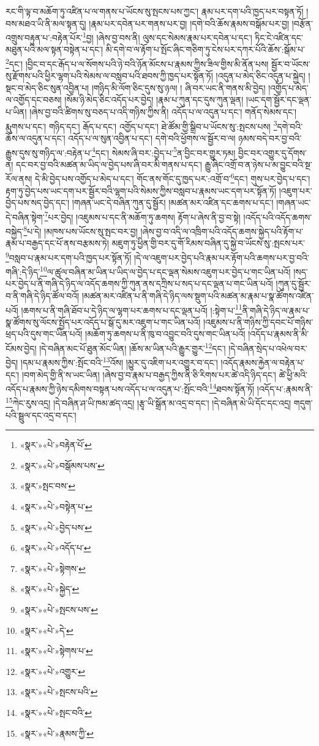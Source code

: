 རང་གི་ལྟ་བ་མཆོག་ཏུ་འཛིན་པ་ལ་གནས་པ་ཡོངས་སུ་སྤངས་པས་ཀྱང་། རྣམ་པར་དག་པའི་ཁྱད་པར་བསྟན་ཏོ། །བས་མཐའ་ཡི་ནི་མལ་སྟན་དུ། །རྣམ་པར་དབེན་པར་གནས་པར་བྱ། །དགེ་བའི་ཆོས་རྣམས་བསྒོམ་པར་བྱ། །བརྩོན་འགྲུས་བརྟུན་པ་:བརྟེན་པོར་\footnote{«སྣར་»«པེ་»བརྟེན་པོ་}བྱ། །ཞེས་བྱ་བས་ནི། ལུས་དང་སེམས་རྣམ་པར་དབེན་པ་དང་། ཏིང་ངེ་འཛིན་དང་མཐུན་པའི་མལ་སྟན་བསྟེན་པ་དང་། མི་དགེ་བ་ལ་རྟོག་པ་སྤོང་ཞིང་གཅིག་ཏུ་ངེས་པར་དཀར་པོའི་ཆོས་:སྒོམ་པ་\footnote{«སྣར་»«པེ་»བསྒོམས་པས་}དང་། །བྱིང་བ་དང་རྒོད་པ་ལ་སོགས་པའི་ཉེ་བའི་ཉོན་མོངས་པ་རྣམས་ཀྱིས་ཟིལ་གྱིས་མི་ནོན་པས། སྦྱོར་བ་ཡོངས་སུ་རྫོགས་པའི་ཕྱིར་ལྷག་པའི་སེམས་ལ་བསླབ་པའི་ཐབས་ཀྱི་ཁྱད་པར་སྟོན་ཏོ། །འདུན་པ་མེད་ཅིང་འདུན་པ་སྐྱེད། །སྡང་བ་མེད་ཅིང་སུན་འབྱིན་པ། །གཉིད་མི་ལོག་ཅིང་དུས་སུ་ཉལ། །
ཞི་བར་ཡང་ནི་གནས་མི་བྱེད། །འགྱོད་པ་མེད་ལ་འགྱོད་དང་བཅས། །སོམ་ཉི་མེད་ཅིང་འདོད་པར་བྱེད། །རྣམ་པ་ཀུན་དང་དུས་ཀུན་ལྡན། །ཡང་དག་སྦྱོར་དང་ལྡན་པ་ཡིན། །ཞེས་བྱ་བའི་ཚིགས་སུ་བཅད་པ་འདི་གཉིས་ཀྱིས་ནི། འདོད་པ་ལ་འདུན་པ་དང་། གནོད་སེམས་དང་། རྨུགས་པ་དང་། གཉིད་དང་། རྒོད་པ་དང་། འགྱོད་པ་དང་། ཐེ་ཚོམ་གྱི་སྒྲིབ་པ་ཡོངས་སུ་:སྤངས་པས། \footnote{«སྣར་»སྤང་བས་}དགེ་བའི་ཆོས་ལ་འདུན་པ་དང་། འདོད་པ་ལ་སུན་འབྱིན་པ་དང་། དགེ་བའི་ཕྱོགས་ལ་སྦྱོར་བ་ལ། ཉམས་བདེ་བར་བྱ་བའི་རྒྱུས་དུས་སུ་གཉིད་ལ་:བརྟེན་པ་\footnote{«སྣར་»«པེ་»བསྟེན་པ་}དང་། སེམས་ཞི་བར་:བྱེད་པ་\footnote{«སྣར་»«པེ་»བྱེད་པས་}ན་བྱིང་བར་གྱུར་ཏམ། བྱིང་བར་འགྱུར་དུ་དོགས་ན། དང་བར་བྱ་བའི་མཚན་མ་ཡིད་ལ་བྱེད་པས་ཞི་བར་མི་གནས་པ་དང་། རྒྱུ་ཞིང་འགྲོ་བ་ན་ཉེས་པ་མ་བྱུང་བའི་སྔ་རོལ་ནས། དེ་མི་བྱེད་པས་འགྱོད་པ་མེད་པ་དང་། གོང་ནས་གོང་དུ་ཁྱད་པར་:འགྲོ་བ་\footnote{«སྣར་»«པེ་»འདོད་པ་}དང་། གུས་པར་བྱེད་པ་དང་། རྟག་ཏུ་བྱེད་པས་ཡང་དག་པར་སྦྱོར་བའི་ལྷག་པའི་སེམས་ཀྱིས་བསླབ་པ་རྣམས་ཡང་དག་པར་སྟོན་ཏོ། །འཇུག་པར་བྱེད་པས་སད་བྱེད་དང་། །གཞན་ཡང་དེ་བཞིན་ཀུན་དུ་སྦྱོར། །མཚན་མར་འཛིན་དང་ཆགས་པ་དང་། །གཞན་ཡང་དེ་བཞིན་སྟེག་\footnote{«སྣར་»«པེ་»སྟེགས་}པར་བྱེད། །འཇུམས་པ་དང་ནི་མཆོག་ཏུ་ཆགས། རྟོག་པ་ཞེས་ནི་བྱ་བ་སྟེ། །འདོད་པའི་འདོད་ཆགས་བསྐྱེད་\footnote{«སྣར་»«པེ་»སྐྱེད་}པ་དེ། །མཁས་པས་ཡོངས་སུ་སྤང་བར་བྱ། །ཞེས་བྱ་བ་འདི་ལ་འཁྲིག་པའི་འདོད་ཆགས་སྐྱེད་པའི་རྟོག་པ་རྣམ་པ་བརྒྱད་དང་པོ་ནས་བརྩམས་ཏེ། མཇུག་ཏུ་ཕྱིན་གྱི་བར་དུ་གོ་རིམས་བཞིན་དུ་སྐྱེ་བ་ཡོངས་སུ་:སྤངས་པར་\footnote{«སྣར་»«པེ་»སྤངས་པས་}བསླབ་པ་རྣམ་པར་དག་པའི་ཁྱད་པར་སྟོན་ཏོ། །དེ་ལ་འཇུག་པར་བྱེད་པའི་རྣམ་པར་རྟོག་པའི་ཆགས་པར་བྱ་བའི་གཞི་:དེ་ཉིད་\footnote{«སྣར་»«པེ་»དེ་}ལ་ཚུལ་བཞིན་མ་ཡིན་པ་ཡིད་ལ་བྱེད་པ་དང་ལྡན་སེམས་འཇུག་པར་བྱེད་པ་གང་ཡིན་པའོ། །སད་པར་བྱེད་པ་ནི་གཞི་དེ་ཉིད་ལ་འདོད་ཆགས་ཀྱི་ཀུན་ནས་དཀྲིས་པ་སད་པ་དང་ལྡན་པ་གང་ཡིན་པའོ། །ཀུན་དུ་སྦྱོར་བ་ནི་གཞི་དེ་ཉིད་ཚོལ་བའོ། །མཚན་མར་འཛིན་པ་ནི་གཞི་དེ་ཉིད་ལས་སྡུག་པའི་མཚན་མ་རྣམ་པ་སྣ་ཚོགས་འཛིན་པའོ། །ཆགས་པ་ནི་གཞི་ཐོབ་པ་དེ་ཉིད་ལ་ལྷག་པར་ཆགས་པ་དང་ལྡན་པའོ། །:སྟེག་པ་\footnote{«སྣར་»«པེ་»སྟེགས་པ་}ནི་གཞི་དེ་ཉིད་ལ་རྣམ་པ་སྣ་ཚོགས་སུ་ལོངས་སྤྱོད་པར་འདོད་པ་སྒོ་དུ་མར་འཇུག་པ་གང་ཡིན་པའོ། །འཇུམས་པ་ནི་གཉིས་ཀྱི་དབང་པོ་གཉིས་ཕྲད་པའི་དུས་གང་ཡིན་པའོ། །མཆོག་ཏུ་ཆགས་པ་ནི་ཁུ་བ་འབྱུང་བའི་དུས་གང་ཡིན་པའོ། །འདོད་པ་རྣམས་ནི་མི་ངོམས་བྱེད། །དེ་བཞིན་མང་པོ་ཐུན་མོང་ཡིན། །ཆོས་མ་ཡིན་པའི་རྒྱུར་གྱུར་\footnote{«སྣར་»«པེ་»འགྱུར་}དང་། །དེ་བཞིན་སྲེད་པ་འཕེལ་བར་བྱེད། །དམ་པ་རྣམས་ཀྱིས་:སྤོང་བའི་\footnote{«སྣར་»«པེ་»སྤངས་པའི་}འོས། །མྱུར་དུ་འཇིག་པར་འགྱུར་བ་དང་། །འདོད་རྣམས་རྐྱེན་ལ་བརྟེན་པ་དང་། །བག་མེད་གྱི་ནི་ས་ཡང་ཡིན། །ཞེས་བྱ་བ་རྣམ་པ་བརྒྱད་ཀྱིས་ནི་ཅི་རིགས་པར་ཚེ་འདི་ཉིད་དང་། ཚེ་ཕྱི་མའི་འདོད་པ་རྣམས་ཀྱི་ཉེས་དམིགས་བསྟན་པས་འདོད་པ་ལ་འདུན་པ་:སྤོང་བའི་\footnote{«སྣར་»«པེ་»སྤང་བའི་}ཐབས་སྟོན་ཏོ། །འདོད་པ་:རྣམས་ནི་\footnote{«སྣར་»«པེ་»རྣམས་ཀྱི་}ཀེང་རུས་འདྲ། །དེ་བཞིན་ཤ་ཡི་ཁམ་ཚད་འདྲ། །རྩྭ་ཡི་སྒྲོན་མ་འདྲ་བ་དང་། །དེ་བཞིན་མེ་ཡི་དོང་དང་འདྲ། གདུག་པའི་སྦྲུལ་དང་འདྲ་བ་དང་། 